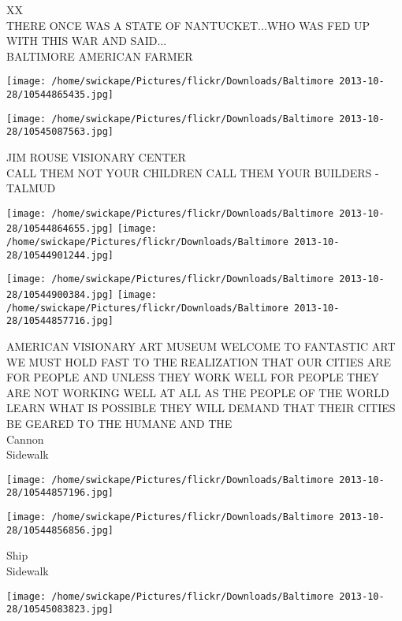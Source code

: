 \documentclass[10pt,letterpaper]{article}
\begin{document}
XX\\
THERE ONCE WAS A STATE OF NANTUCKET...WHO WAS FED UP WITH THIS WAR AND SAID...\\
BALTIMORE AMERICAN FARMER\\
\pagebreak

\texttt{[image: /home/swickape/Pictures/flickr/Downloads/Baltimore 2013-10-28/10544865435.jpg]}

\vspace{0.25in}
\texttt{[image: /home/swickape/Pictures/flickr/Downloads/Baltimore 2013-10-28/10545087563.jpg]}

JIM ROUSE VISIONARY CENTER\\
CALL THEM NOT YOUR CHILDREN CALL THEM YOUR BUILDERS {-} TALMUD\\
\pagebreak

\texttt{[image: /home/swickape/Pictures/flickr/Downloads/Baltimore 2013-10-28/10544864655.jpg]}
\texttt{[image: /home/swickape/Pictures/flickr/Downloads/Baltimore 2013-10-28/10544901244.jpg]}

\texttt{[image: /home/swickape/Pictures/flickr/Downloads/Baltimore 2013-10-28/10544900384.jpg]}
\texttt{[image: /home/swickape/Pictures/flickr/Downloads/Baltimore 2013-10-28/10544857716.jpg]}

AMERICAN VISIONARY ART MUSEUM WELCOME TO FANTASTIC ART\\
WE MUST HOLD FAST TO THE REALIZATION THAT OUR CITIES ARE FOR PEOPLE AND UNLESS THEY WORK WELL FOR PEOPLE THEY ARE NOT WORKING WELL AT ALL AS THE PEOPLE OF THE WORLD LEARN WHAT IS POSSIBLE THEY WILL DEMAND THAT THEIR CITIES BE GEARED TO THE HUMANE AND THE\\
Cannon\\
Sidewalk\\
\pagebreak

\texttt{[image: /home/swickape/Pictures/flickr/Downloads/Baltimore 2013-10-28/10544857196.jpg]}

\vspace{0.25in}
\texttt{[image: /home/swickape/Pictures/flickr/Downloads/Baltimore 2013-10-28/10544856856.jpg]}

Ship\\
Sidewalk\\
\pagebreak

\texttt{[image: /home/swickape/Pictures/flickr/Downloads/Baltimore 2013-10-28/10545083823.jpg]}
\end{document}
